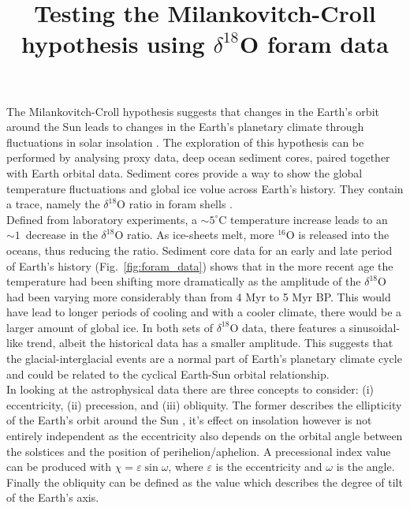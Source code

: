 \documentclass[12pt, onecolumn]{revtex4}    %
\begin{document}
                     

\title{Testing the Milankovitch-Croll hypothesis using $\delta^{18}$O foram data} 
\maketitle

\vspace{-4ex}

The Milankovitch-Croll hypothesis suggests that changes in the Earth's orbit around the Sun leads to changes in the Earth's planetary climate through fluctuations in solar insolation \cite{ruddiman_climate}. The exploration of this hypothesis can be performed by analysing proxy data, deep ocean sediment cores, paired together with Earth orbital data. Sediment cores provide a way to show the global temperature fluctuations and global ice volue across Earth's history. They contain a trace, namely the $\delta^{18}$O ratio in foram shells \cite{droxler_climate}. \\

Defined from laboratory experiments, a $\sim 5^{\circ}\mathrm{C}$ temperature increase leads to an $\sim 1$\textperthousand\ decrease in the $\delta^{18}$O ratio. As ice-sheets melt, more $^{16}$O is released into the oceans, thus reducing the ratio. Sediment core data for an early and late period of Earth's history (Fig.~\ref{fig:foram_data}) shows that in the more recent age the temperature had been shifting more dramatically as the amplitude of the $\delta^{18}$O had been varying more considerably than from 4 Myr to 5 Myr BP. This would have lead to longer periods of cooling and with a cooler climate, there would be a larger amount of global ice. In both sets of $\delta^{18}$O data, there features a sinusoidal-like trend, albeit the historical data has a smaller amplitude. This suggests that the glacial-interglacial events are a normal part of Earth's planetary climate cycle and could be related to the cyclical Earth-Sun orbital relationship. \\

In looking at the astrophysical data there are three concepts to consider: (i) eccentricity, (ii) precession, and (iii) obliquity. The former describes the ellipticity of the Earth's orbit around the Sun \cite{carroll_astro}, it's effect on insolation however is not entirely independent as the eccentricity also depends on the orbital angle between the solstices and the position of perihelion/aphelion. A precessional index value can be produced with $\chi= \varepsilon \sin{\omega}$, where $\varepsilon$ is the eccentricity and $\omega$ is the angle. Finally the obliquity can be defined as the value which describes the degree of tilt of the Earth's axis. \\
\end{document}
